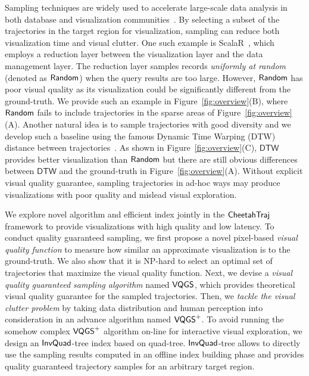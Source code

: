  Sampling techniques are widely used to accelerate large-scale data analysis in both database and visualization communities~\cite{qin2020making,DBLP:conf/sigmod/DingHCC016,DBLP:journals/pvldb/KimBPIMR15,park2016visualization}. By selecting a subset of the trajectories in the target region for visualization, sampling can reduce both visualization time and visual clutter. One such example is ScalaR~\cite{battle2013dynamic}, which employs a reduction layer between the visualization layer and the data management layer. The reduction layer samples records \textit{uniformly at random} (denoted as $\mathsf{Random}$) when the query results are too large. However, $\mathsf{Random}$ has poor visual quality as its visualization could be significantly different from the ground-truth. We provide such an example in Figure~\ref{fig:overview}(B), where $\mathsf{Random}$ fails to include trajectories in the sparse areas of Figure~\ref{fig:overview}(A). Another natural idea is to sample trajectories with good diversity and we develop such a baseline using the famous Dynamic Time Warping (DTW) distance between trajectories~\cite{borcan2012improving}. As shown in Figure~\ref{fig:overview}(C), $\mathsf{DTW}$ provides better visualization than $\mathsf{Random}$ but there are still obvious differences between $\mathsf{DTW}$ and the ground-truth in Figure~\ref{fig:overview}(A). Without explicit visual quality guarantee, sampling trajectories in ad-hoc ways may produce visualizations with poor quality and mislead visual exploration.

 We explore novel algorithm and efficient index jointly in the $\mathsf{CheetahTraj}$ framework to provide visualizations with high quality and low latency. To conduct quality guaranteed sampling, we first propose a novel pixel-based \textit{visual quality function} to measure how similar an approximate visualization is to the ground-truth. We also show that it is NP-hard to select an optimal set of trajectories that maximize the visual quality function. Next, we devise a \textit{visual quality guaranteed sampling algorithm} named $\mathsf{VQGS}$, which provides theoretical visual quality guarantee for the sampled trajectories. Then, we \textit{tackle the visual clutter problem} by taking data distribution and human perception into consideration in an advance algorithm named $\mathsf{VQGS}^+$. To avoid running the somehow complex $\mathsf{VQGS}^+$ algorithm on-line for interactive visual exploration, we design an $\mathsf{InvQuad}$-tree index based on quad-tree. $\mathsf{InvQuad}$-tree allows to directly use the sampling results computed in an offline index building phase and provides quality guaranteed trajectory samples for an arbitrary target region.


